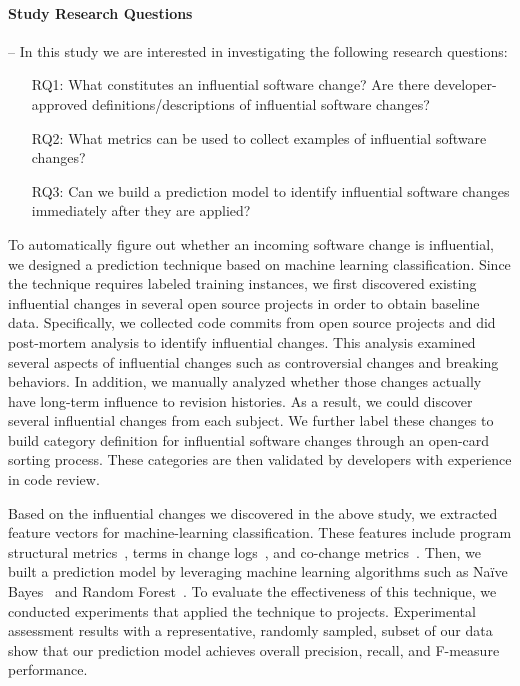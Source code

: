 \paragraph*{\bf Study Research Questions} -- In this study we are interested in investigating the following research questions:
\begin{itemize}
\itemsep0em
	\item[RQ1:] What constitutes an influential software change? Are there developer-approved definitions/descriptions of influential software changes?
	\item[RQ2:] What metrics can be used to collect examples of influential software changes?
	\item[RQ3:] Can we build a prediction model to identify influential software changes immediately after they are applied?
\end{itemize}


To automatically figure out whether an incoming software change is influential, we
designed a prediction technique based on machine learning classification. Since
the technique requires labeled training instances, we first discovered existing
influential changes in several open source projects in order to obtain baseline
data. Specifically, we collected \numChanges code commits from \numSubjects open source projects and did
post-mortem analysis to identify influential changes. This analysis examined
several aspects of influential changes such as controversial changes and breaking
behaviors. In addition, we manually analyzed whether those changes actually have
long-term influence to revision histories.
As a result, we could discover several influential changes from each subject.
We further label these changes to build category definition for influential software changes
through an open-card sorting process. These categories are then validated by
developers with experience in code review.   

Based on the influential changes we discovered in the above study, we extracted
feature vectors for machine-learning classification. These features include program structural
metrics~\cite{kim_classifying_2008}, terms in change
logs~\cite{kim_classifying_2008}, and co-change metrics~\cite{Beyer05}.
Then, we built a prediction model by leveraging machine learning algorithms such as
Na\"{i}ve Bayes~\cite{lewis:ecml:1998,mlbook} and Random
Forest~\cite{breiman_random_2001}.
To evaluate the effectiveness of this technique, we conducted experiments that
applied the technique to \numSubjects projects.
Experimental assessment results with a representative, randomly sampled, subset of our data show that 
our prediction model achieves overall
\precisionwild precision, \recallwild recall, and \fmeasurewild F-measure performance.

